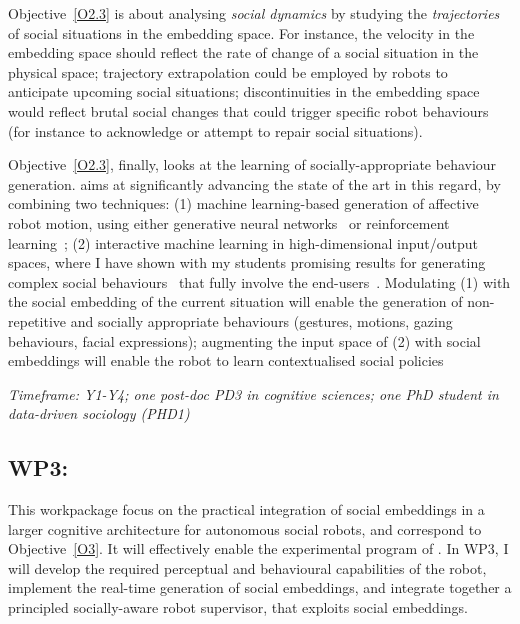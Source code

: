 

Objective~\ref{O2.3} is about analysing \emph{social dynamics} by
studying the \emph{trajectories} of social situations in the embedding space.
For instance, the velocity in the embedding space should reflect the rate of
change of a social situation in the physical space; trajectory extrapolation
could be employed by robots to anticipate upcoming social situations;
discontinuities in the embedding space would reflect brutal social changes that
could trigger specific robot behaviours (for instance to acknowledge or attempt
to repair social situations).

Objective~\ref{O2.3}, finally, looks at the learning of socially-appropriate
behaviour generation. \project aims at significantly advancing the state of the
art in this regard, by combining two techniques: (1) machine learning-based
generation of affective robot motion, using either generative neural
networks~\cite{marmpena2019generating,suguitan2020moveae} or reinforcement
learning~; (2) interactive machine learning in high-dimensional
input/output spaces, where I have shown with my students promising results for
generating complex social behaviours~\cite{senft2019teaching, winkle2020couch}
that fully involve the end-users~\cite{winkle2018social}. Modulating (1) with
the social embedding of the current situation will enable the generation of
non-repetitive and socially appropriate behaviours (gestures, motions, gazing
behaviours, facial expressions); augmenting the input space of (2) with social
embeddings will enable the robot to learn contextualised social policies


\vspace{1em}
\noindent\emph{Timeframe: Y1-Y4; one post-doc PD3 in cognitive sciences; one PhD student in data-driven sociology (PHD1)}

\subsection{WP3: \textbf{\WPC}}

This workpackage focus on the practical integration of social embeddings in a
larger cognitive architecture for autonomous social robots, and correspond to
Objective~\ref{O3}. It will effectively enable the experimental program of
\project.  In WP3, I will develop the required perceptual and behavioural
capabilities of the robot, implement the real-time generation of social
embeddings, and integrate together a principled socially-aware robot supervisor,
that exploits social embeddings.

